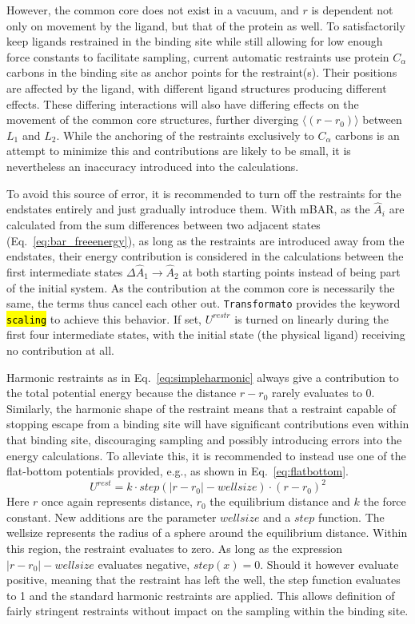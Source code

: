 \documentclass[oneside]{scrreprt}
\newcommand{\code}[1]{\texttt{\hl{#1}}}
\begin{document}
However, the common core does not exist in a vacuum, and $r$ is dependent not only on movement by the ligand, but that of the protein as well. To satisfactorily keep ligands restrained in the binding site while still allowing for low enough force constants to facilitate sampling, current automatic restraints use protein $C_\alpha$ carbons in the binding site as anchor points for the restraint(s). Their positions are affected by the ligand, with different ligand structures producing different effects. These differing interactions will also have differing effects on the movement of the common core structures, further diverging $\langle (r-r_0) \rangle$ between $L_1$ and $L_2$. While the anchoring of the restraints exclusively to $C_\alpha$  carbons is an attempt to minimize this and contributions are likely to be small, it is nevertheless an inaccuracy introduced into the calculations.

To avoid this source of error, it is recommended to turn off the restraints for the endstates entirely and just gradually introduce them. With mBAR, as the $\hat{A}_i$ are calculated from the sum differences between two adjacent states (Eq.~\ref{eq:bar_freeenergy}), as long as the restraints are introduced away from the endstates, their energy contribution is considered in the calculations between the first intermediate states $\Delta \hat{A}_{1}\rightarrow \hat{A}_{2}$ at both starting points instead of being part of the initial system. As the contribution at the common core is necessarily the same, the terms thus cancel each other out. \texttt{Transformato} provides the keyword \code{scaling} to achieve this behavior. If set, $U^{restr}$ is turned on linearly during the first four intermediate states, with the  initial state (the physical ligand) receiving no contribution at all.

Harmonic restraints as in Eq.~\ref{eq:simpleharmonic} always give a contribution to the total potential energy because the distance $r-r_0$ rarely evaluates to 0. Similarly, the harmonic shape of the restraint means that a restraint capable of stopping escape from a binding site will have significant contributions even within that binding site, discouraging sampling and possibly introducing errors into the energy calculations. To alleviate this, it is recommended to instead use one of the flat-bottom potentials provided, e.g., as shown in Eq.~\ref{eq:flatbottom}.
\begin{equation}\label{eq:flatbottom}
    U^{rest}=k \cdot step(|r-r_0|-wellsize) \cdot (r-r_0)^2
\end{equation}
Here $r$ once again represents distance, $r_0$  the equilibrium distance and $k$ the force constant. New additions are the parameter $wellsize$ and a $step$ function. The wellsize represents the radius of a sphere around the equilibrium distance. Within this region, the restraint evaluates to zero. As long as the expression $|r-r_0|-wellsize$ evaluates negative, $step(x)=0$. Should it however evaluate positive, meaning that the restraint has left the well, the step function evaluates to 1 and the standard harmonic restraints are applied. This allows definition of fairly stringent restraints without impact on the sampling within the binding site.
\end{document}
